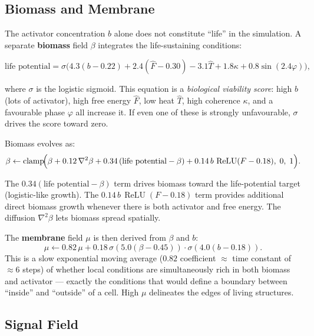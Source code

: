 \documentclass[12pt,a4paper]{article}
\DeclareMathOperator{\clamp}{clamp}
\DeclareMathOperator{\relu}{ReLU}
\begin{document}
\subsection{Biomass and Membrane}

The activator concentration $b$ alone does not constitute ``life''
in the simulation.
A separate \textbf{biomass} field $\beta$ integrates the
life-sustaining conditions:

\begin{equation}
  \text{life potential} = \sigma\!\bigl(
    4.3(b-0.22) + 2.4(\hat{F}-0.30) - 3.1\hat{T}
    + 1.8\kappa + 0.8\sin(2.4\varphi)\bigr),
  \label{eq:lifepot}
\end{equation}

where $\sigma$ is the logistic sigmoid.
This equation is a \emph{biological viability score}:
high $b$ (lots of activator), high free energy $\hat{F}$,
low heat $\hat{T}$, high coherence $\kappa$,
and a favourable phase $\varphi$ all increase it.
If even one of these is strongly unfavourable,
$\sigma$ drives the score toward zero.

Biomass evolves as:
\begin{equation}
  \beta \leftarrow \clamp\!\Bigl(
    \beta + 0.12\,\nabla^2\beta
    + 0.34\,(\text{life potential} - \beta)
    + 0.14\,b\,\relu(F - 0.18),\;0,\;1\Bigr).
\end{equation}

The $0.34(\text{life potential} - \beta)$ term drives biomass toward
the life-potential target (logistic-like growth).
The $0.14\,b\,\relu(F-0.18)$ term provides additional direct
biomass growth whenever there is both activator and free energy.
The diffusion $\nabla^2\beta$ lets biomass spread spatially.

The \textbf{membrane} field $\mu$ is then derived from $\beta$ and $b$:
\begin{equation}
  \mu \leftarrow 0.82\,\mu + 0.18\,
    \sigma(5.0(\beta - 0.45))\cdot\sigma(4.0(b - 0.18)).
\end{equation}
This is a slow exponential moving average
($0.82$ coefficient $\approx$ time constant of $\approx 6$ steps) of
whether local conditions are simultaneously rich in both
biomass and activator —
exactly the conditions that would define a boundary between
``inside'' and ``outside'' of a cell.
High $\mu$ delineates the edges of living structures.

\subsection{Signal Field}
\end{document}
